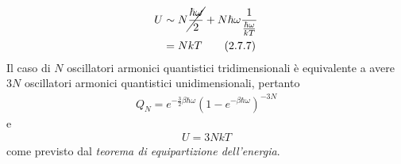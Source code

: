 \documentclass{article}
\begin{document}
\begin{align}
    U &\sim N\cancel{\frac{\hbar\omega}{2}} + N\hbar\omega\frac{1}{\frac{\hbar\omega}{kT}} \notag \\
    &= NkT \tag{2.7.7}
\end{align}
Il caso di $N$ oscillatori armonici quantistici tridimensionali è equivalente a avere $3N$ oscillatori armonici quantistici unidimensionali, pertanto 
\begin{align}
    Q_N = e^{-\frac{3}{2}\beta\hbar\omega}\left(1 - e^{-\beta\hbar\omega}\right)^{-3N} \tag{2.7.8}
\end{align}
e 
\begin{align}
    U = 3NkT \tag{2.7.9}
\end{align}
come previsto dal \textit{teorema di equipartizione dell'energia}.

\newpage
\end{document}
